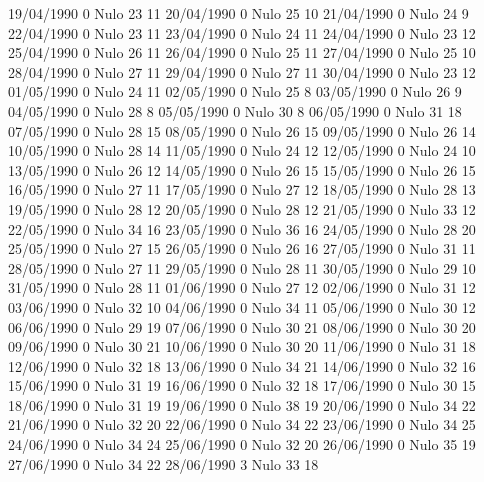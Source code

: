 19/04/1990  0     Nulo    23     11 
20/04/1990  0     Nulo    25     10 
21/04/1990  0     Nulo    24     9 
22/04/1990  0     Nulo    23     11 
23/04/1990  0     Nulo    24     11 
24/04/1990  0     Nulo    23     12 
25/04/1990  0     Nulo    26     11 
26/04/1990  0     Nulo    25     11 
27/04/1990  0     Nulo    25     10 
28/04/1990  0     Nulo    27     11 
29/04/1990  0     Nulo    27     11 
30/04/1990  0     Nulo    23     12 
01/05/1990  0     Nulo    24     11 
02/05/1990  0     Nulo    25     8 
03/05/1990  0     Nulo    26     9 
04/05/1990  0     Nulo    28     8 
05/05/1990  0     Nulo    30     8 
06/05/1990  0     Nulo    31     18 
07/05/1990  0     Nulo    28     15 
08/05/1990  0     Nulo    26     15 
09/05/1990  0     Nulo    26     14 
10/05/1990  0     Nulo    28     14 
11/05/1990  0     Nulo    24     12 
12/05/1990  0     Nulo    24     10 
13/05/1990  0     Nulo    26     12 
14/05/1990  0     Nulo    26     15 
15/05/1990  0     Nulo    26     15 
16/05/1990  0     Nulo    27     11 
17/05/1990  0     Nulo    27     12 
18/05/1990  0     Nulo    28     13 
19/05/1990  0     Nulo    28     12 
20/05/1990  0     Nulo    28     12 
21/05/1990  0     Nulo    33     12 
22/05/1990  0     Nulo    34     16 
23/05/1990  0     Nulo    36     16 
24/05/1990  0     Nulo    28     20 
25/05/1990  0     Nulo    27     15 
26/05/1990  0     Nulo    26     16 
27/05/1990  0     Nulo    31     11 
28/05/1990  0     Nulo    27     11 
29/05/1990  0     Nulo    28     11 
30/05/1990  0     Nulo    29     10 
31/05/1990  0     Nulo    28     11 
01/06/1990  0     Nulo    27     12 
02/06/1990  0     Nulo    31     12 
03/06/1990  0     Nulo    32     10 
04/06/1990  0     Nulo    34     11 
05/06/1990  0     Nulo    30     12 
06/06/1990  0     Nulo    29     19 
07/06/1990  0     Nulo    30     21 
08/06/1990  0     Nulo    30     20 
09/06/1990  0     Nulo    30     21 
10/06/1990  0     Nulo    30     20 
11/06/1990  0     Nulo    31     18 
12/06/1990  0     Nulo    32     18 
13/06/1990  0     Nulo    34     21 
14/06/1990  0     Nulo    32     16 
15/06/1990  0     Nulo    31     19 
16/06/1990  0     Nulo    32     18 
17/06/1990  0     Nulo    30     15 
18/06/1990  0     Nulo    31     19 
19/06/1990  0     Nulo    38     19 
20/06/1990  0     Nulo    34     22 
21/06/1990  0     Nulo    32     20 
22/06/1990  0     Nulo    34     22 
23/06/1990  0     Nulo    34     25 
24/06/1990  0     Nulo    34     24 
25/06/1990  0     Nulo    32     20 
26/06/1990  0     Nulo    35     19 
27/06/1990  0     Nulo    34     22 
28/06/1990  3     Nulo    33     18 
